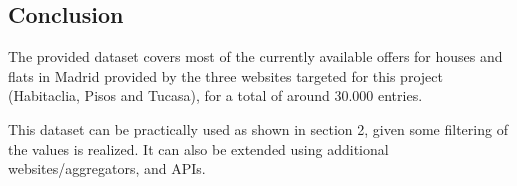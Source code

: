 \documentclass{article}
\newcommand{\ezskip}{\medskip\noindent}
\begin{document}
\begin{normalsize}
        
        \newpage
    	\section{Conclusion}
    	
    	The provided dataset covers most of the currently available offers for houses and flats in Madrid provided by the three websites targeted for this project (Habitaclia, Pisos and Tucasa), for a total of around 30.000 entries.

    	\ezskip This dataset can be practically used as shown in section 2, given some filtering of the values is realized. It can also be extended using additional websites/aggregators, and APIs.
    	
\end{normalsize}
  
\end{document}
